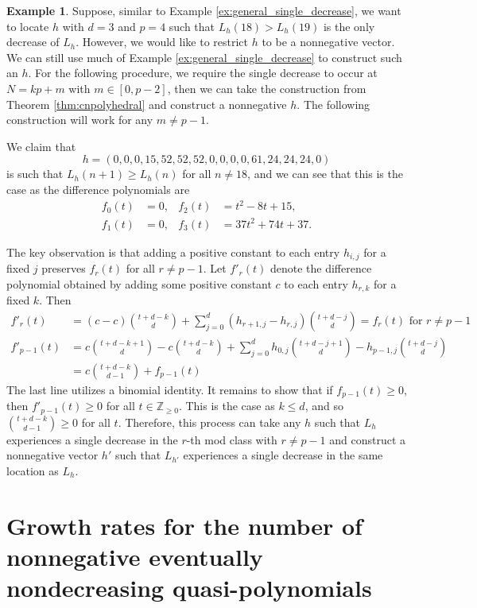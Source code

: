 \documentclass[12pt]{amsart}
\theoremstyle{definition}
\newtheorem{example}[thm]{Example}
\numberwithin{equation}{section}
\renewcommand\>{\rangle}
\newcommand\<{\langle}
\newcommand\0{\mathbf{0}}
\newcommand\ZZ{\mathbb{Z}}
\begin{document}
\begin{example}
	Suppose, similar to Example \ref{ex:general_single_decrease}, we want to locate $h$ with $d= 3$ and $p =4$ such that $L_h(18) > L_h(19)$ is the only decrease of $L_h$. However, we would like to restrict $h$ to be a nonnegative vector. We can still use much of Example \ref{ex:general_single_decrease} to construct such an $h$. For the following procedure, we require the single decrease to occur at $N = kp + m$  with $m \in [0,p-2]$, then we can take the construction from Theorem \ref{thm:cnpolyhedral} and construct a nonnegative $h$. The following construction will work for any $m \neq p-1$.

	We claim that 
	\[h = (0,0,0,15,52,52,52,0,0,0,0,61,24,24,24,0)\]
	is such that $L_h(n+1) \geq L_h(n)$ for all $n \neq 18$, and we can see that this is the case as the difference polynomials are
	\begin{align*}
		f_0(t) &= 0, & f_2(t) &= t^2 - 8t +15,\\
		f_1(t)&= 0, & f_3(t) &= 37t^2 + 74t + 37.
	\end{align*}
	
	The key observation is that adding a positive constant to each entry $h_{i,j}$ for a fixed $j$ preserves $f_r(t)$ for all $r \neq p-1$. Let $f'_r(t)$ denote the difference polynomial obtained by adding some positive constant $c$ to each entry $h_{r,k}$ for a fixed $k$. Then
	\begin{align*}
		f'_{r}(t) &=  (c - c) \binom{t+d-k}{d} + \sum_{j = 0}^{d} (h_{r+1,j} - h_{r,j}) \binom{t+d-j}{d} = f_r(t)  \text{ for } r \neq p-1\\
		f'_{p-1}(t) &= c\binom{t+d-k+1}{d} - c\binom{t+d-k}{d} + \sum_{j = 0}^d h_{0,j} \binom{t+d-j+1}{d} - h_{p-1,j} \binom{t+d-j}{d}\\
		&= c\binom{t+d-k}{d-1} + f_{p-1}(t)
	\end{align*} 
	The last line utilizes a binomial identity. It remains to show that if $f_{p-1}(t) \geq 0$, then $f'_{p-1}(t) \geq 0$ for all $t \in \ZZ_{\geq 0}$. This is the case as $k \leq d$, and so $\binom{t+d-k}{d-1} \geq 0$ for all $t$. Therefore, this process can take any $h$ such that $L_h$ experiences a single decrease in the $r$-th mod class with $r \neq p-1$ and construct a nonnegative vector $h'$ such that $L_{h'}$ experiences a single decrease in the same location as $L_h$.
\end{example}


\section{Growth rates for the number of nonnegative eventually nondecreasing quasi-polynomials}\label{sec:growth}
\end{document}
